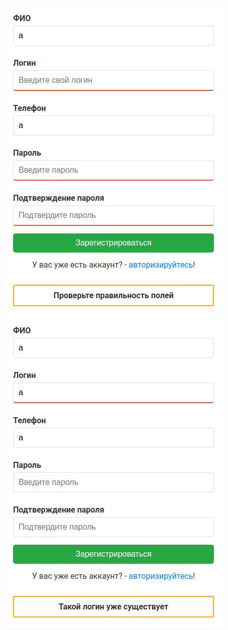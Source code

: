 \documentclass[a4paper,12pt]{article}
\begin{document}
\begin{enumerate}
          \includegraphics[scale=0.5]{media/unregistered/reg_check.png} \\
          \includegraphics[scale=0.5]{media/unregistered/reg_exists.png} \\
\end{enumerate}
\end{document}
